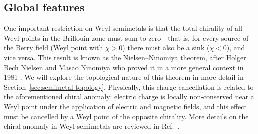\subsection{Global features}

One important restriction on Weyl semimetals is that the total chirality of all Weyl points in the Brillouin zone must sum to zero---that is, for every source of the Berry field (Weyl point with $\chi>0$) there must also be a sink ($\chi<0$), and vice versa. This result is known as the Nielsen--Ninomiya theorem, after Holger Bech Nielsen and Masao Ninomiya who proved it in a more general context in 1981 \cite{NielsenNinomiya_I,NielsenNinomiya_II}. We will explore the topological nature of this theorem in more detail in Section~\ref{sec:semimetal-topology}. Physically, this charge cancellation is related to the aforementioned chiral anomaly: electric charge is locally non-conserved near a Weyl point under the application of electric and magnetic fields, and this effect must be cancelled by a Weyl point of the opposite chirality. More details on the chiral anomaly in Weyl semimetals are reviewed in Ref.~\cite{Hosur_WSM-transport}.

